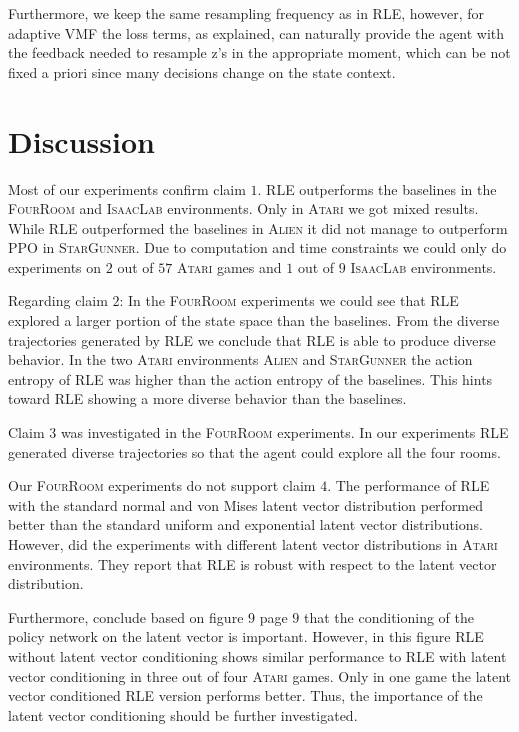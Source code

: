 \documentclass[10pt]{article} %
\begin{document}
Furthermore, we keep the same resampling frequency as in \textsc{RLE}, however, for adaptive VMF the loss terms, as explained, can naturally provide the agent with the feedback needed to resample z's in the appropriate moment, 
which can be not fixed a priori since many decisions change on the state context. 

\vspace{-6pt}
\hypertarget{sec5}{\section{Discussion}}
\vspace{-6pt}
Most of our experiments confirm claim $1$. \textsc{RLE} outperforms the baselines in the \textsc{FourRoom} and \textsc{IsaacLab} environments. Only in \textsc{Atari} we got mixed results. While \textsc{RLE} outperformed the baselines in \textsc{Alien} it did not manage to outperform \textsc{PPO} in \textsc{StarGunner}. Due to computation and time constraints we could only do experiments on $2$ out of $57$ \textsc{Atari} games and $1$ out of $9$ \textsc{IsaacLab} environments. 

Regarding claim $2$: In the \textsc{FourRoom} experiments we could see that \textsc{RLE} explored a larger portion of the state space than the baselines. From the diverse trajectories generated by \textsc{RLE} we conclude that \textsc{RLE} is able to produce diverse behavior. In the two \textsc{Atari} environments \textsc{Alien} and \textsc{StarGunner} the action entropy of \textsc{RLE} was higher than the action entropy of the baselines. This hints toward \textsc{RLE} showing a more diverse behavior than the baselines. 

Claim $3$ was investigated in the \textsc{FourRoom} experiments. In our experiments \textsc{RLE} generated diverse trajectories so that the agent could explore all the four rooms.

Our \textsc{FourRoom} experiments do not support claim $4$. The performance of \textsc{RLE} with the standard normal and von Mises latent vector distribution performed better than the standard uniform and exponential latent vector distributions. However, \cite{rle-paper} did the experiments with different latent vector distributions in \textsc{Atari} environments. They report that \textsc{RLE} is robust with respect to the latent vector distribution.

Furthermore, \cite{rle-paper} conclude based on figure $9$ page $9$ that the conditioning of the policy network on the latent vector is important. However, in this figure \textsc{RLE} without latent vector conditioning shows similar performance to \textsc{RLE} with latent vector conditioning in three out of four \textsc{Atari} games. Only in one game the latent vector conditioned \textsc{RLE} version performs better. Thus, the importance of the latent vector conditioning should be further investigated.
\end{document}
